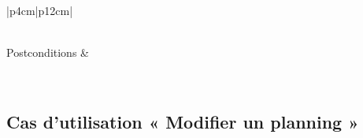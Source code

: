 \begin{longtable}{|p{4cm}|p{12cm}|}
\begin{minipage}[t]{\linewidth}
\begin{enumerate}[itemindent=0pt, leftmargin=*, nosep,before=\vspace{-0.5\baselineskip}]
                                \end{enumerate}
                            \end{minipage}
                        \\
                        
                        \hline
                        Postconditions &   \\
                        \hline
                    \caption{Description du cas d'utilisation « Consulter planning d'un employé »}\\
            \end{longtable}    

    \subsection*{Cas d'utilisation « Modifier un planning »}
